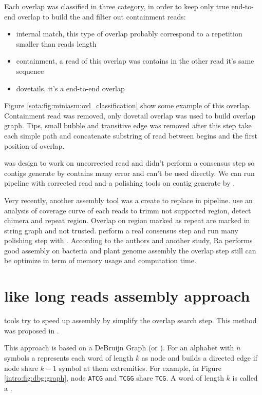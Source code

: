 \documentclass[main]{subfiles}
\begin{document}
Each overlap was classified in three category, in order to keep only true end-to-end overlap to build the \OLC and filter out containment reads:
\begin{itemize}
    \item internal match, this type of overlap probably correspond to a repetition smaller than reads length
    \item containment, a read of this overlap was contains in the other read it's same sequence
    \item dovetails, it's a end-to-end overlap
\end{itemize}
Figure \ref{sota:fig:miniasm:ovl_classification} show some example of this overlap. Containment read was removed, only dovetail overlap was used to build overlap graph. Tips, small bubble and transitive edge was removed after this step \miniasm take each simple path and concatenate substring of read between begins and the first position of overlap.

\miniasm was design to work on uncorrected read and didn't perform a consensus step so contigs generate by \miniasm contains many error and can't be used directly. We can run \minimap \miniasm pipeline with corrected read and a polishing tools on contig generate by \miniasm. 

Very recently, another assembly tool \cite{Ra} was a create to replace \miniasm in \minimap \miniasm pipeline.  use an analysis of coverage curve of each reads to trimm not supported region, detect chimera and repeat region. Overlap on region marked as repeat are marked in string graph and not trusted.  perform a real consensus step and run many polishing step with . According to the authors and another study\cite{long_read_assembler_comparison}, Ra performs good assembly on bacteria and plant genome assembly the overlap step still can be optimize in term of memory usage and computation time.

\section{\DBG like long reads assembly approach} \label{section:sota:wtdbg}

\DBG tools try to speed up assembly by simplify the overlap search step. This method was proposed in  \cite{eulerian_approach}.

This approach is based on a DeBruijn Graph (or \DBG). For an alphabet with $n$ symbols a \DBG represents each word of length $k$ as node and builds a directed edge if node share $k - 1$ symbol at them extremities. For example, in Figure \ref{intro:fig:dbg:graph}, node \texttt{ATCG} and \texttt{TCGG} share \texttt{TCG}. A word of length $k$ is called a \kmer.
\end{document}
